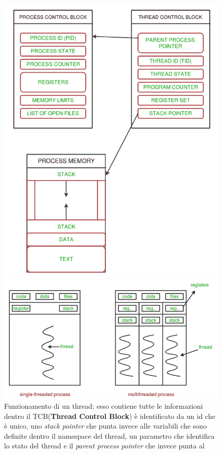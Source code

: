 \documentclass{report}
\begin{document}
\begin{figure}
	\centering
	\begin{minipage}{0.48\textwidth}
		\includegraphics[scale=0.30]{multithreading_1.png}
	\end{minipage}
	\hspace{0.01\textwidth}
	\begin{minipage}{0.48\textwidth}
		\includegraphics[scale=0.30]{multithreading_2.png}
	\end{minipage}
	\caption{Funzionamento di un thread: esso contiene tutte le informazioni dentro il TCB(\textbf{Thread Control Block}) è identificato da un id che è unico, uno \emph{stack pointer} che punta invece alle variabili che sono definite dentro il namespace del thread, un parametro che identifica lo stato del thread e il \emph{parent process pointer} che invece punta al}
\end{figure}
\end{document}
